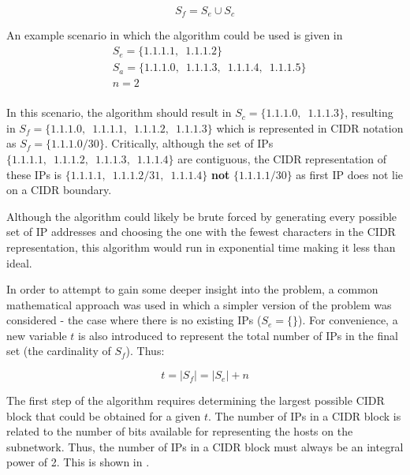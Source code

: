 \begin{equation}
S_f = S_e \cup S_c
\end{equation}

An example scenario in which the algorithm could be used is given in 
\begin{equation}\label{eq:ipAlgExample}
\begin{split}
 &   S_e = \{1.1.1.1,\enspace1.1.1.2\} \\
 &   S_a = \{1.1.1.0,\enspace1.1.1.3,\enspace1.1.1.4,\enspace1.1.1.5\} \\
 &   n = 2 \\
\end{split}
\end{equation}

In this scenario, the algorithm should result in $S_c = \{1.1.1.0,\enspace1.1.1.3\}$, resulting in $S_f = \{1.1.1.0,\enspace1.1.1.1,\enspace1.1.1.2,\enspace1.1.1.3\}$ which is represented in CIDR notation as $S_f = \{1.1.1.0/30\}$. Critically, although the set of IPs $\{1.1.1.1,\enspace1.1.1.2,\enspace1.1.1.3,\enspace1.1.1.4\}$ are contiguous, the CIDR representation of these IPs is $\{1.1.1.1,\enspace1.1.1.2/31,\enspace1.1.1.4\}$ \textbf{not} $\{1.1.1.1/30\}$ as first IP does not lie on a CIDR boundary.

Although the algorithm could likely be brute forced by generating every possible set of IP addresses and choosing the one with the fewest characters in the CIDR representation, this algorithm would run in exponential time making it less than ideal.

In order to attempt to gain some deeper insight into the problem, a common mathematical approach was used in which a simpler version of the problem was considered - the case where there is no existing IPs ($S_e = \{\}$). For convenience, a new variable $t$ is also introduced to represent the total number of IPs in the final set (the cardinality of $S_f$). Thus:

\begin{equation}
t = |S_f| = |S_e| + n
\end{equation}

The first step of the algorithm requires determining the largest possible CIDR block that could be obtained for a given $t$. The number of IPs in a CIDR block is related to the number of bits available for representing the hosts on the subnetwork. Thus, the number of IPs in a CIDR block must always be an integral power of 2. This is shown in . 


